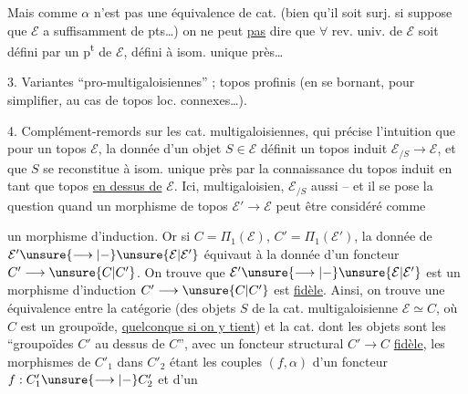 Mais comme $\alpha$ n'est pas une équivalence de cat. (bien qu'il soit   surj. si  suppose que $\mathcal E$ a suffisamment de pts\dots) on ne peut \uline{pas} dire que $\forall$ rev. univ. de $\mathcal E$ soit défini par un p\textsuperscript{t} de $\mathcal E$, défini à isom. unique près\dots



3. Variantes ``pro-multigaloisiennes'' ; topos profinis (en se bornant, pour simplifier, au cas de topos loc. connexes\dots).

4. Complément-remords sur les cat. multigaloisiennes, qui précise l'intuition que pour un topos $\mathcal E$, la donnée d'un objet $S\in\mathcal E$ définit un topos induit $\mathcal E_{/S}\longrightarrow\mathcal E$, et que $S$ se reconstitue à isom. unique près par la connaissance du topos induit en tant que topos \uline{en dessus de} $\mathcal E$. Ici,   multigaloisien, $\mathcal E_{/S}$ aussi -- et il se pose la question quand un morphisme de topos  $\mathcal E'\longrightarrow\mathcal E$ peut être considéré comme



un morphisme d'induction. Or si $C=\Pi_1(\mathcal E)$, $C'=\Pi_1(\mathcal E')$, la donnée de $\mathcal E'\unsure{\longrightarrow|-}\unsure{\mathcal E|\mathcal E'}$ équivaut à la donnée d'un foncteur $C'\longrightarrow\unsure{C|C'}$. On trouve que $\mathcal E'\unsure{\longrightarrow|-}\unsure{\mathcal E|\mathcal E'}$ est un morphisme d'induction  $C'\longrightarrow\unsure{C|C'}$ est \uline{fidèle}. Ainsi, on trouve une équivalence entre la catégorie  (des objets $S$ de la cat. multigaloisienne $\mathcal E\simeq\widehat C$,  où $C$ est un groupoïde, \uline{quelconque si on y tient})
et la cat. dont les objets sont les ``groupoïdes $C'$ au dessus de $C$'', avec un foncteur structural $C'\longrightarrow C$ \uline{fidèle}, les morphismes de $C'_1$ dans $C'_2$ étant les   couples $(f,\alpha)$ d'un foncteur $f:C'_1\unsure{\longrightarrow|-}C'_2$ et d'un



